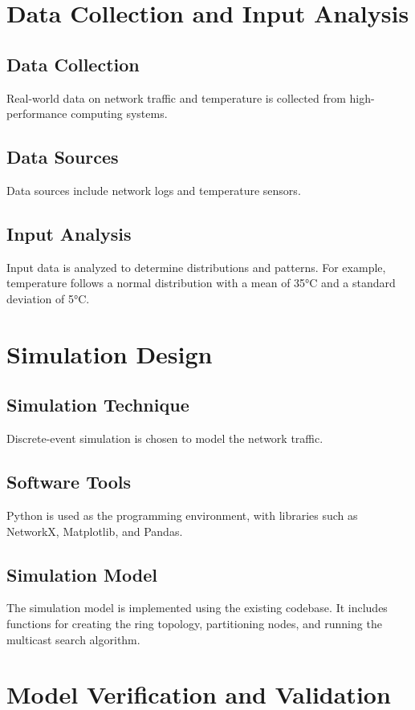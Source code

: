 \documentclass[12pt]{article}
\begin{document}
\section{Data Collection and Input Analysis}
\subsection{Data Collection}
Real-world data on network traffic and temperature is collected from high-performance computing systems.

\subsection{Data Sources}
Data sources include network logs and temperature sensors.

\subsection{Input Analysis}
Input data is analyzed to determine distributions and patterns. For example, temperature follows a normal distribution with a mean of 35°C and a standard deviation of 5°C.

\section{Simulation Design}
\subsection{Simulation Technique}
Discrete-event simulation is chosen to model the network traffic.

\subsection{Software Tools}
Python is used as the programming environment, with libraries such as NetworkX, Matplotlib, and Pandas.

\subsection{Simulation Model}
The simulation model is implemented using the existing codebase. It includes functions for creating the ring topology, partitioning nodes, and running the multicast search algorithm.

\section{Model Verification and Validation}
\end{document}

